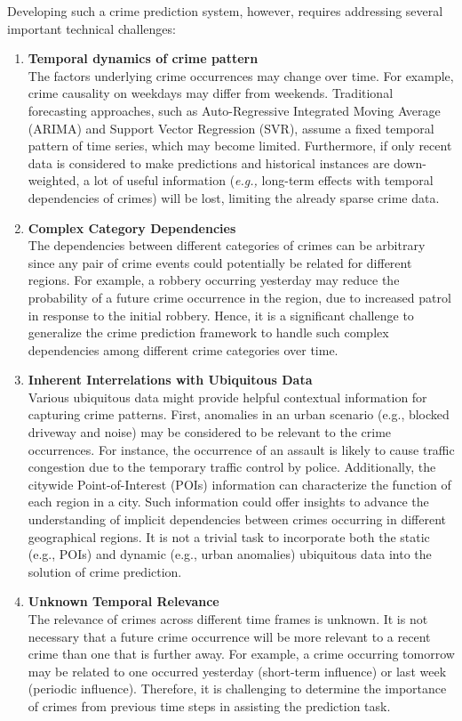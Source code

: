 \noindent Developing such a crime prediction system, however, requires
addressing several important technical challenges:
\begin{enumerate}
    \item \textbf{Temporal dynamics of crime pattern}\\[0.2cm]The factors underlying crime occurrences may change over time. For example, crime
    causality on weekdays may differ from weekends. Traditional forecasting approaches, such as Auto-Regressive Integrated Moving
    Average (ARIMA) and Support Vector Regression (SVR),
    assume a fixed temporal pattern of time series, which may become
    limited. Furthermore, if only recent data is considered to make predictions and historical instances are down-weighted, a lot of useful
    information (\emph{e.g.,} long-term effects with temporal dependencies of
    crimes) will be lost, limiting the already sparse crime data. 
    \newpage
    \item \textbf{Complex Category Dependencies}\\[0.2cm]
    The dependencies between different categories of crimes can be arbitrary since any pair of crime events could potentially be related for different regions. For example, a robbery occurring yesterday may reduce the probability of a future crime occurrence in the region, due to increased patrol in response to the initial robbery. Hence, it is a significant challenge to generalize the crime prediction framework to handle such complex dependencies among different crime categories over time.
    
    \item \textbf{Inherent Interrelations with Ubiquitous Data}\\[0.2cm]
    Various ubiquitous data might provide helpful contextual information for capturing crime patterns. First, anomalies in an urban scenario (e.g.,
    blocked driveway and noise) may be considered to be relevant to
    the crime occurrences. For instance, the occurrence of an assault is
    likely to cause traffic congestion due to the temporary traffic control by police. Additionally, the citywide Point-of-Interest (POIs)
    information can characterize the function of each region in a city.
    Such information could offer insights to advance the understanding of implicit dependencies between crimes occurring in different
    geographical regions. It is not a trivial task to incorporate both the
    static (e.g., POIs) and dynamic (e.g., urban anomalies) ubiquitous
    data into the solution of crime prediction.
    
    \item \textbf{Unknown Temporal Relevance}\\[0.2cm]
    The relevance of crimes across different time frames is unknown. It is not necessary that a future crime occurrence will be more relevant to a recent crime than one that is further away. For example, a crime occurring tomorrow may be related to one occurred yesterday (short-term influence) or last week (periodic influence). Therefore, it is challenging to determine the importance of crimes from previous time steps in assisting the prediction task.
\end{enumerate}
